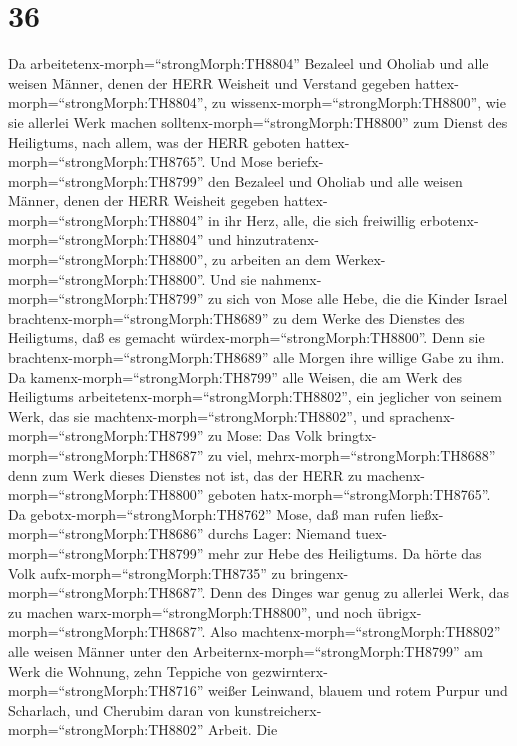\hypertarget{section-35}{%
\section{36}\label{section-35}}

 Da arbeitetenx-morph=``strongMorph:TH8804'' Bezaleel und
Oholiab und alle weisen Männer, denen der HERR Weisheit und Verstand
gegeben hattex-morph=``strongMorph:TH8804'', zu
wissenx-morph=``strongMorph:TH8800'', wie sie allerlei Werk machen
solltenx-morph=``strongMorph:TH8800'' zum Dienst des Heiligtums, nach
allem, was der HERR geboten hattex-morph=``strongMorph:TH8765''.
 Und Mose beriefx-morph=``strongMorph:TH8799'' den Bezaleel
und Oholiab und alle weisen Männer, denen der HERR Weisheit gegeben
hattex-morph=``strongMorph:TH8804'' in ihr Herz, alle, die sich
freiwillig erbotenx-morph=``strongMorph:TH8804'' und
hinzutratenx-morph=``strongMorph:TH8800'', zu arbeiten an dem
Werkex-morph=``strongMorph:TH8800''.  Und sie
nahmenx-morph=``strongMorph:TH8799'' zu sich von Mose alle Hebe, die die
Kinder Israel brachtenx-morph=``strongMorph:TH8689'' zu dem Werke des
Dienstes des Heiligtums, daß es gemacht
würdex-morph=``strongMorph:TH8800''. Denn sie
brachtenx-morph=``strongMorph:TH8689'' alle Morgen ihre willige Gabe zu
ihm.  Da kamenx-morph=``strongMorph:TH8799'' alle Weisen,
die am Werk des Heiligtums arbeitetenx-morph=``strongMorph:TH8802'', ein
jeglicher von seinem Werk, das sie
machtenx-morph=``strongMorph:TH8802'',  und
sprachenx-morph=``strongMorph:TH8799'' zu Mose: Das Volk
bringtx-morph=``strongMorph:TH8687'' zu viel,
mehrx-morph=``strongMorph:TH8688'' denn zum Werk dieses Dienstes not
ist, das der HERR zu machenx-morph=``strongMorph:TH8800'' geboten
hatx-morph=``strongMorph:TH8765''.  Da
gebotx-morph=``strongMorph:TH8762'' Mose, daß man rufen
ließx-morph=``strongMorph:TH8686'' durchs Lager: Niemand
tuex-morph=``strongMorph:TH8799'' mehr zur Hebe des Heiligtums. Da hörte
das Volk aufx-morph=``strongMorph:TH8735'' zu
bringenx-morph=``strongMorph:TH8687''.  Denn des Dinges war
genug zu allerlei Werk, das zu machen warx-morph=``strongMorph:TH8800'',
und noch übrigx-morph=``strongMorph:TH8687''.  Also
machtenx-morph=``strongMorph:TH8802'' alle weisen Männer unter den
Arbeiternx-morph=``strongMorph:TH8799'' am Werk die Wohnung, zehn
Teppiche von gezwirnterx-morph=``strongMorph:TH8716'' weißer Leinwand,
blauem und rotem Purpur und Scharlach, und Cherubim daran von
kunstreicherx-morph=``strongMorph:TH8802'' Arbeit.  Die

